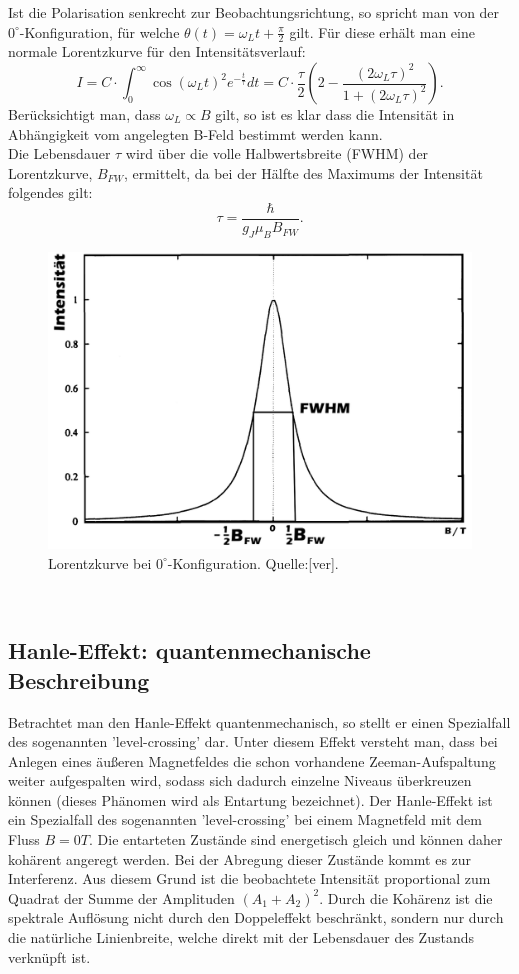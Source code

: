 Ist die Polarisation senkrecht zur Beobachtungsrichtung, so spricht man von der $0^{\circ}$-Konfiguration, für welche $\theta(t)=\omega_{L}t+\frac{\pi}{2}$ gilt. Für diese erhält man eine normale Lorentzkurve für den Intensitätsverlauf: \[I=C\cdot\int_{0}^{\infty}\cos(\omega_{L}t)^{2}e^{-\frac{t}{\tau}}dt=C\cdot\frac{\tau}{2}\left(2-\frac{(2\omega_{L}\tau)^{2}}{1+(2\omega_{L}\tau)^{2}}\right).\]
Berücksichtigt man, dass $\omega_{L}\propto B$ gilt, so ist es klar dass die Intensität in Abhängigkeit vom angelegten B-Feld bestimmt werden kann. \\
Die Lebensdauer $\tau$ wird über die volle Halbwertsbreite (FWHM) der Lorentzkurve, $B_{FW}$, ermittelt, da bei der Hälfte des Maximums der Intensität folgendes gilt: \[\tau=\frac{\hbar}{g_{J}\mu_{B} B_{FW}}.\]
\begin{center}
\begin{figure}[h]
\hspace{1.5cm}
\includegraphics[scale=0.3]{Bilder/fwhm}
\caption{Lorentzkurve bei $0^{\circ}$-Konfiguration. Quelle:[ver].}
\end{figure}
\end{center}
~\\
\subsection{Hanle-Effekt: quantenmechanische Beschreibung}
Betrachtet man den Hanle-Effekt quantenmechanisch, so stellt er einen Spezialfall des sogenannten 'level-crossing' dar. Unter diesem Effekt versteht man, dass bei Anlegen eines äußeren Magnetfeldes die schon vorhandene Zeeman-Aufspaltung weiter aufgespalten wird, sodass sich dadurch einzelne Niveaus überkreuzen können (dieses Phänomen wird als Entartung bezeichnet). Der Hanle-Effekt ist ein Spezialfall des sogenannten 'level-crossing' bei einem Magnetfeld mit dem Fluss $B=0T$. Die entarteten Zustände sind energetisch gleich und können daher kohärent angeregt werden. Bei der Abregung dieser Zustände kommt es zur Interferenz. Aus diesem Grund ist die beobachtete Intensität proportional zum Quadrat der Summe der Amplituden $(A_{1}+A_{2})^{2}$. Durch die Kohärenz ist die spektrale Auflösung nicht durch den Doppeleffekt beschränkt, sondern nur durch die natürliche Linienbreite, welche direkt mit der Lebensdauer des Zustands verknüpft ist.
